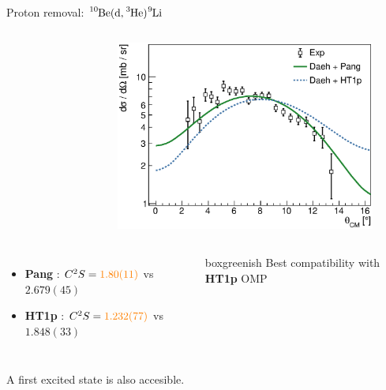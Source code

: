 \documentclass[sans,
frameno, %
mp,
usenames,dvipsnames, %
onlytextwidth, %
t,%
11pt]{beamer}
\newcommand{\iso}[2]{\ce{^{#1}#2}}
\begin{document}
\begin{frame}{Proton removal: $\iso{10}{Be}(\textrm{d}, \iso{3}{He})\iso{9}{Li}$}
{\begin{columns}[c]
{\begin{figure}
                \end{figure}
            }
            \hfill
            {
                \vspace{-12pt}
                \begin{figure}
                    \centering
                    \includegraphics[width=\linewidth, cfbox=Mulberry 1pt 0pt 0pt]{figures/Workshop/acculina_ht1p.eps}
                \end{figure}
            }
        \end{columns}
        \begin{columns}[c]
            {
                \begin{itemize}
                    \item \textbf{Pang} : $C^{2}S = \textcolor{orange}{1.80(11)}$ vs \textcolor{Mulberry}{$2.679(45)$}
                    \item \textbf{HT1p} : $C^{2}S = \textcolor{orange}{1.232(77)}$ vs \textcolor{Mulberry}{$1.848(33)$}
                \end{itemize}
            }
            \hfill
            {
                \hfill
                \begin{beamercolorbox}[sep=1ex,center, rounded=true, wd=0.95\linewidth]{boxgreenish}
                    Best compatibility with \textbf{HT1p} OMP
                \end{beamercolorbox}
                \hfill
            }
        \end{columns}
    }
    {
        A first excited state is also accesible.
}
\end{frame}
\end{document}
